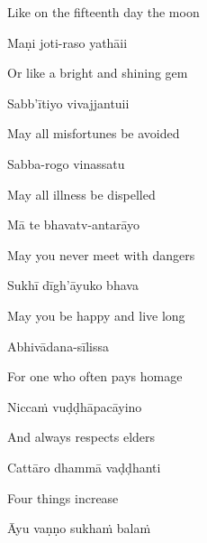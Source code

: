 \begin{english}
  Like on the fifteenth day the moon
\end{english}

Maṇi joti-raso yathāii


\begin{english}
  Or like a bright and shining gem\\
\end{english}

Sabb'ītiyo vivajjantuii


\begin{english}
  May all misfortunes be avoided
\end{english}

Sabba-rogo vinassatu

\begin{english}
  May all illness be dispelled
\end{english}

Mā te bhavatv-antarāyo

\begin{english}
  May you never meet with dangers
\end{english}

Sukhī dīgh'āyuko bhava

\begin{english}
  May you be happy and live long
\end{english}

Abhivādana-sīlissa

\begin{english}
  For one who often pays homage
\end{english}

Niccaṁ vuḍḍhāpacāyino

\begin{english}
  And always respects elders
\end{english}

Cattāro dhammā vaḍḍhanti

\begin{english}
  Four things increase
\end{english}

Āyu vaṇṇo sukhaṁ balaṁ

